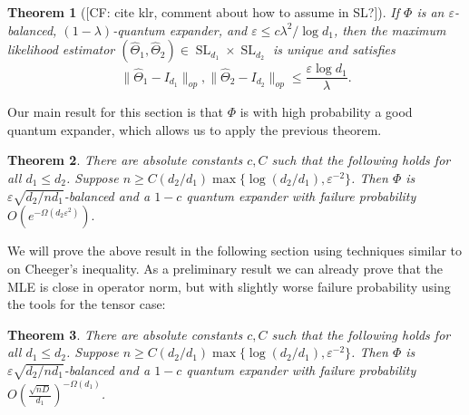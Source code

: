 \documentclass{article}
\newtheorem{theorem}{Theorem}
\newcommand\eps{\varepsilon}
\newcommand\SL{\operatorname{SL}}
\newcommand{\CF}[1]{{\color{purple}[CF: #1]}}
\begin{document}
\begin{theorem}[\CF{cite klr, comment about how to assume in SL?}]\label{thm:klr}
If $\Phi$ is an $\eps$-balanced, $(1 - \lambda)$-quantum expander, and $\eps \leq c \lambda^2/\log d_1$, then the maximum likelihood estimator $(\widehat{\Theta}_1, \widehat{\Theta}_2) \in \SL_{d_1}\times \SL_{d_2}$ is unique and satisfies
$$\| \widehat{\Theta}_1 - I_{d_1}\|_{op}, \| \widehat{\Theta}_2 - I_{d_2}\|_{op} \leq \frac{\eps \log d_1}{\lambda}.$$
\end{theorem}
Our main result for this section is that $\Phi$ is with high probability a good quantum expander, which allows us to apply the previous theorem. 

\begin{theorem}\label{thm:operator-cheeger}
There are absolute constants $c, C$ such that the following holds for all $d_1 \leq d_2$. Suppose $n \geq C (d_2/d_1) \max\{\log (d_2/d_1),  \eps^{-2}\} $. Then $\Phi$ is $\eps \sqrt{d_2/n d_1}$-balanced and a $1 - c$ quantum expander with failure probability $O(e^{ - \Omega( d_2 \eps^2)}).$
\end{theorem}

We will prove the above result in the following section using techniques similar to \cite{FM20} on Cheeger's inequality. As a preliminary result we can already prove that the MLE is close in operator norm, but with slightly worse failure probability using the tools for the tensor case:

\begin{theorem} \label{thm: operator-Pisier}
There are absolute constants $c, C$ such that the following holds for all $d_1 \leq d_2$. Suppose $n \geq C (d_2/d_1) \max\{\log (d_2/d_1),  \eps^{-2}\} $. Then $\Phi$ is $\eps \sqrt{d_2/n d_1}$-balanced and a $1 - c$ quantum expander with failure probability $O \left(\frac {\sqrt{nD}}{d_1}\right)^{ - \Omega(d_1)}$. 
\end{theorem}
\end{document}
